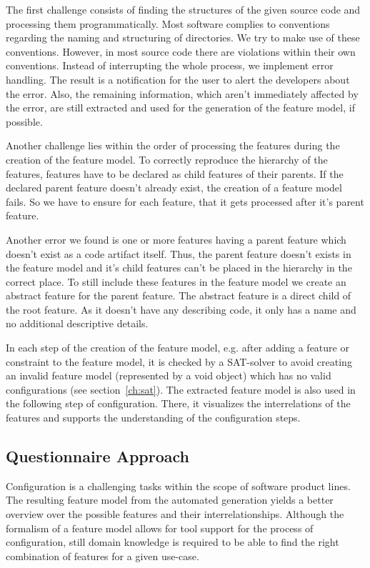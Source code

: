 The first challenge consists of finding the structures of the given source code and processing them programmatically. Most software complies to conventions regarding the naming and structuring of directories. We try to make use of these conventions. However, in most source code there are violations within their own conventions. Instead of interrupting the whole process, we implement error handling. The result is a notification for the user to alert the developers about the error. Also, the remaining information, which aren't immediately affected by the error, are still extracted and used for the generation of the feature model, if possible.

Another challenge lies within the order of processing the features during the creation of the feature model. To correctly reproduce the hierarchy of the features, features have to be declared as child features of their parents. If the declared parent feature doesn't already exist, the creation of a feature model fails. So we have to ensure for each feature, that it gets processed after it's parent feature.

Another error we found is one or more features having a parent feature which doesn't exist as a code artifact itself. Thus, the parent feature doesn't exists in the feature model and it's child features can't be placed in the hierarchy in the correct place. To still include these features in the feature model we create an abstract feature \cite{fospl} for the parent feature. The abstract feature is a direct child of the root feature. As it doesn't have any describing code, it only has a name and no additional descriptive details.

In each step of the creation of the feature model, e.g. after adding a feature or constraint to the feature model, it is checked by a SAT-solver to avoid creating an invalid feature model (represented by a void object) which has no valid configurations (see section~\ref{ch:sat}). The extracted feature model is also used in the following step of configuration. There, it visualizes the interrelations of the features and supports the understanding of the configuration steps.


\subsection{Questionnaire Approach}
Configuration is a challenging tasks within the scope of software product lines. The resulting feature model from the automated generation yields a better overview over the possible features and their interrelationships. Although the formalism of a feature model allows for tool support for the process of configuration, still domain knowledge is required to be able to find the right combination of features for a given use-case.

